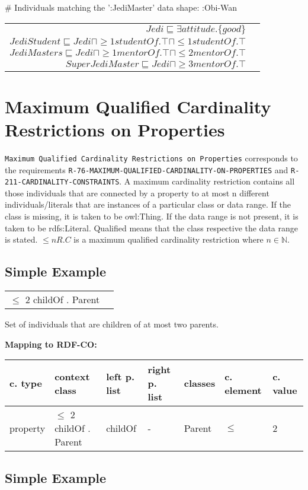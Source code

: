 \documentclass{llncs}
\newcommand{\ms}[1]{\texttt{#1}}
\newenvironment{gcotable}{
  \scriptsize
  \sffamily
  \vspace{0cm}
	\begin{center}
	\textbf{\vspace{0.4cm}Mapping to RDF-CO:} \\
  \begin{tabular}{l|l|l|l|l|l|l}
	\hline
  \textbf{c. type} & \textbf{context class} & \textbf{left p. list} & \textbf{right p. list} & \textbf{classes} & \textbf{c. element} & \textbf{c. value} \\
  \hline

}{
  \hline
  \end{tabular}
	\end{center}
}
\newenvironment{DL}{
  \vspace{0cm}
	\begin{center}
  \begin{tabular}{r l}

}{
  \end{tabular}
	\end{center}
}
\begin{document}
\begin{ex}
# Individuals matching the ’:JediMaster’ data shape:
:Obi-Wan
\end{ex}

\begin{DL}
$Jedi \sqsubseteq \exists attitude.\{good\} $\\
$JediStudent \sqsubseteq Jedi \sqcap \geq1 studentOf.\top \sqcap \leq1 studentOf.\top$ \\
$JediMasters \sqsubseteq Jedi \sqcap \geq1 mentorOf.\top \sqcap \leq2 mentorOf.\top $\\
$SuperJediMaster \sqsubseteq Jedi \sqcap  \geq3 mentorOf.\top $
\end{DL}

\section{Maximum Qualified Cardinality Restrictions on Properties}

\ms{Maximum Qualified Cardinality Restrictions on Properties} corresponds to the requirements
\ms{R-76-MAXIMUM-QUALIFIED-CARDINALITY-ON-PROPERTIES} and
\ms{R-211-CARDINALITY-CONSTRAINTS}.
A maximum cardinality restriction contains all those individuals that are connected by a property to at most n different individuals/literals that are instances of a particular class or data range. If the class is missing, it is taken to be owl:Thing. If the data range is not present, it is taken to be rdfs:Literal.
Qualified means that the class respective the data range is stated. 
$\leq n R. C$ is a maximum qualified cardinality restriction where $n \in \mathbb{N}$.

\subsection{Simple Example}

\begin{DL}
$\leq$  2 childOf . Parent
\end{DL}

Set of individuals that are children of at most two parents.

\begin{gcotable}
property & $\leq$  2 childOf . Parent & childOf & - & Parent & $\leq$ & 2 \\
\end{gcotable}

\subsection{Simple Example}
\end{document}
